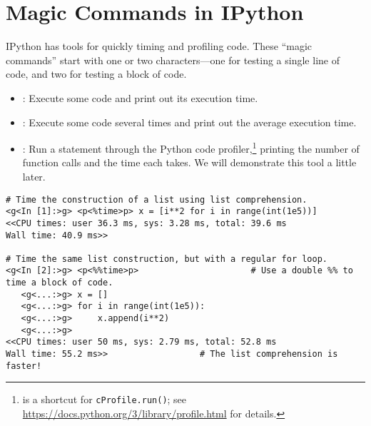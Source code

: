 
\section*{Magic Commands in IPython} %

IPython has tools for quickly timing and profiling code.
These ``magic commands'' start with one or two \li{\%} characters---one for testing a single line of code, and two for testing a block of code.
\begin{itemize}
\item {}: Execute some code and print out its execution time.
\item {}: Execute some code several times and print out the average execution time.
\item {}: Run a statement through the Python code profiler,\footnote{{} is a shortcut for \texttt{cProfile.run()}; see \url{https://docs.python.org/3/library/profile.html} for details.} printing the number of function calls and the time each takes. We will demonstrate this tool a little later.
\end{itemize}

\begin{lstlisting}
# Time the construction of a list using list comprehension.
<g<In [1]:>g> <p<%time>p> x = [i**2 for i in range(int(1e5))]
<<CPU times: user 36.3 ms, sys: 3.28 ms, total: 39.6 ms
Wall time: 40.9 ms>>

# Time the same list construction, but with a regular for loop.
<g<In [2]:>g> <p<%%time>p>                      # Use a double %% to time a block of code.
   <g<...:>g> x = []
   <g<...:>g> for i in range(int(1e5)):
   <g<...:>g>     x.append(i**2)
   <g<...:>g>
<<CPU times: user 50 ms, sys: 2.79 ms, total: 52.8 ms
Wall time: 55.2 ms>>                  # The list comprehension is faster!
\end{lstlisting}


